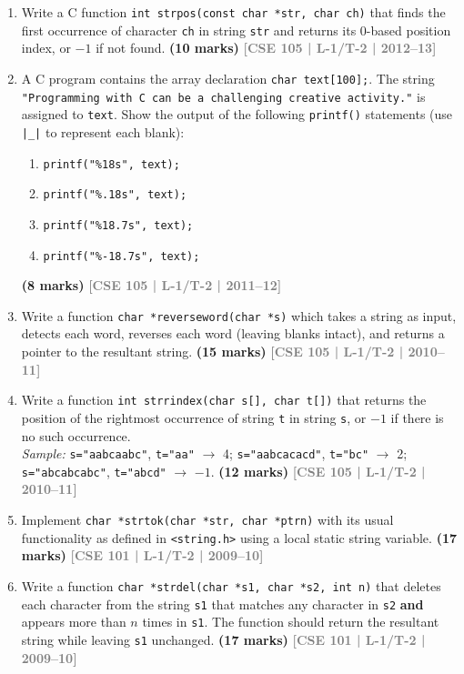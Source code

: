 \documentclass[12pt,a3paper]{article}
\newcommand{\yr}[1]{\hfill\textcolor{gray}{\small\textbf{[#1]}}}
\newcommand{\mk}[1]{\textcolor{orange!70!black}{\small\textbf{(#1 marks)}}}
\begin{document}
\begin{enumerate}
\item Write a C function \texttt{int strpos(const char *str, char ch)} that finds the first occurrence of character \texttt{ch} in string \texttt{str} and returns its 0-based position index, or $-1$ if not found.
\mk{10} \yr{CSE 105 | L-1/T-2 | 2012--13}

\item A C program contains the array declaration \texttt{char text[100];}. The string \texttt{"Programming with C can be a challenging creative activity."} is assigned to \texttt{text}. Show the output of the following \texttt{printf()} statements (use \texttt{|\_|} to represent each blank):
\begin{enumerate}
  \item \texttt{printf("\%18s", text);}
  \item \texttt{printf("\%.18s", text);}
  \item \texttt{printf("\%18.7s", text);}
  \item \texttt{printf("\%-18.7s", text);}
\end{enumerate}
 
\mk{8} \yr{CSE 105 | L-1/T-2 | 2011--12}

\item Write a function \texttt{char *reverseword(char *s)} which takes a string as input, detects each word, reverses each word (leaving blanks intact), and returns a pointer to the resultant string.
\mk{15} \yr{CSE 105 | L-1/T-2 | 2010--11}

\item Write a function \texttt{int strrindex(char s[], char t[])} that returns the position of the rightmost occurrence of string \texttt{t} in string \texttt{s}, or $-1$ if there is no such occurrence.\\
\textit{Sample:} \texttt{s="aabcaabc"}, \texttt{t="aa"} $\to$ 4; \quad \texttt{s="aabcacacd"}, \texttt{t="bc"} $\to$ 2; \quad \texttt{s="abcabcabc"}, \texttt{t="abcd"} $\to$ $-1$.
\mk{12} \yr{CSE 105 | L-1/T-2 | 2010--11}

\item Implement \texttt{char *strtok(char *str, char *ptrn)} with its usual functionality as defined in \texttt{<string.h>} using a local static string variable.
\mk{17} \yr{CSE 101 | L-1/T-2 | 2009--10}

\item Write a function \texttt{char *strdel(char *s1, char *s2, int n)} that deletes each character from the string \texttt{s1} that matches any character in \texttt{s2} \textbf{and} appears more than $n$ times in \texttt{s1}. The function should return the resultant string while leaving \texttt{s1} unchanged.
\mk{17} \yr{CSE 101 | L-1/T-2 | 2009--10}


\end{enumerate}
\end{document}
